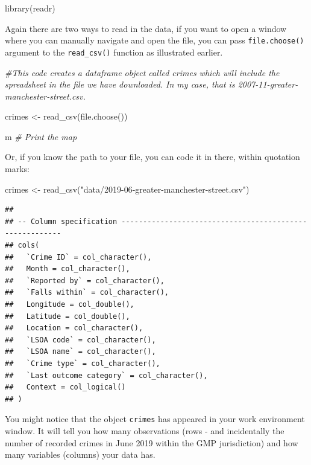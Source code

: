 \documentclass[
]{book}
\newenvironment{Shaded}{\begin{snugshade}}{\end{snugshade}}
\newcommand{\CommentTok}[1]{\textcolor[rgb]{0.56,0.35,0.01}{\textit{#1}}}
\newcommand{\FunctionTok}[1]{\textcolor[rgb]{0.00,0.00,0.00}{#1}}
\newcommand{\NormalTok}[1]{#1}
\newcommand{\OtherTok}[1]{\textcolor[rgb]{0.56,0.35,0.01}{#1}}
\newcommand{\StringTok}[1]{\textcolor[rgb]{0.31,0.60,0.02}{#1}}
\begin{document}
\begin{Shaded}
\begin{Highlighting}[]
\FunctionTok{library}\NormalTok{(readr)}
\end{Highlighting}
\end{Shaded}

Again there are two ways to read in the data, if you want to open a window where you can manually navigate and open the file, you can pass \texttt{file.choose()} argument to the \texttt{read\_csv()} function as illustrated earlier.

\begin{Shaded}
\begin{Highlighting}[]
\CommentTok{\#This code creates a dataframe object called crimes which will include the spreadsheet in the file we have downloaded. In my case, that is 2007{-}11{-}greater{-}manchester{-}street.csv.}

\NormalTok{crimes }\OtherTok{\textless{}{-}} \FunctionTok{read\_csv}\NormalTok{(}\FunctionTok{file.choose}\NormalTok{())}

\NormalTok{m }\CommentTok{\# Print the map}
\end{Highlighting}
\end{Shaded}

Or, if you know the path to your file, you can code it in there, within quotation marks:

\begin{Shaded}
\begin{Highlighting}[]
\NormalTok{crimes }\OtherTok{\textless{}{-}} \FunctionTok{read\_csv}\NormalTok{(}\StringTok{"data/2019{-}06{-}greater{-}manchester{-}street.csv"}\NormalTok{)}
\end{Highlighting}
\end{Shaded}

\begin{verbatim}
## 
## -- Column specification --------------------------------------------------------
## cols(
##   `Crime ID` = col_character(),
##   Month = col_character(),
##   `Reported by` = col_character(),
##   `Falls within` = col_character(),
##   Longitude = col_double(),
##   Latitude = col_double(),
##   Location = col_character(),
##   `LSOA code` = col_character(),
##   `LSOA name` = col_character(),
##   `Crime type` = col_character(),
##   `Last outcome category` = col_character(),
##   Context = col_logical()
## )
\end{verbatim}

You might notice that the object \texttt{crimes} has appeared in your work environment window. It will tell you how many observations (rows - and incidentally the number of recorded crimes in June 2019 within the GMP jurisdiction) and how many variables (columns) your data has.
\end{document}
